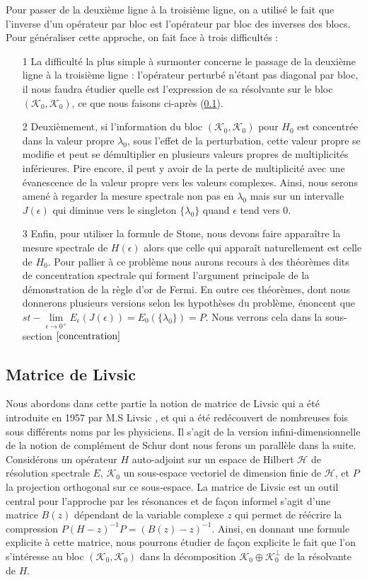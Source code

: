 \documentclass[12pt,openany,a4paper, titlepage]{article}
\newcommand{\HH}{\mathcal{H}}
\newcommand{\KK}{\mathcal{K}}
\newcommand{\inv}{^{-1}}
\newcommand{\limeo}{\lim\limits_{\epsilon \rightarrow 0^+}}
\theoremstyle{definition}
\theoremstyle{definition}
\theoremstyle{definition}
\theoremstyle{definition}
\theoremstyle{definition}
\theoremstyle{definition}
\begin{document}
Pour passer de la deuxième ligne à la troisième ligne, on a utilisé le fait que l'inverse d'un opérateur par bloc est l'opérateur par bloc des inverses des blocs. 
Pour généraliser cette approche, on fait face à trois difficultés :
\begin{enumerate}
    \item[1] La difficulté la plus simple à surmonter concerne le passage de la deuxième ligne à la troisième ligne : l'opérateur perturbé n'étant pas diagonal par bloc, il nous faudra étudier quelle est l'expression de sa résolvante sur le bloc $(\KK_0,\KK_0)$, ce que nous faisons ci-après (\ref{matrice_livsic}).
    \item[2] Deuxièmement, si l'information du bloc $(\KK_0,\KK_0)$ pour $H_0$ est concentrée dans la valeur propre $\lambda_0$, sous l'effet de la perturbation, cette valeur propre se modifie et peut se démultiplier en plusieurs valeurs propres de multiplicités inférieures. Pire encore, il peut y avoir de la perte de multiplicité avec une évanescence de la valeur propre vers les valeurs complexes. Ainsi, nous serons amené à regarder la mesure spectrale non pas en $\lambda_0$ mais sur un intervalle $J(\epsilon)$ qui diminue vers le singleton $\{\lambda_0\}$ quand $\epsilon$ tend vers $0$.
    \item[3] Enfin, pour utiliser la formule de Stone, nous devons faire apparaître la mesure spectrale de $H(\epsilon)$ alors que celle qui apparaît naturellement est celle de $H_0$. Pour pallier à ce problème nous aurons recours à des théorèmes dits de concentration spectrale qui forment l'argument principale de la démonstration de la règle d'or de Fermi. En outre ces théorèmes, dont nous donnerons plusieurs versions selon les hypothèses du problème, énoncent que $st-\limeo E_\epsilon(J(\epsilon)) = E_0(\{\lambda_0\}) = P$. Nous verrons cela dans la sous-section $\ref{concentration}$
\end{enumerate}

\subsection{Matrice de Livsic}\label{matrice_livsic}

Nous abordons dans cette partie la notion de matrice de Livsic qui a été introduite en 1957 par M.S Livsic \cite{HOWLAND1975415}, et qui a été redécouvert de nombreuses fois sous différents noms par les physiciens. Il s'agit de la version infini-dimensionnelle de la notion de complément de Schur dont nous ferons un parallèle dans la suite. Considérons un opérateur $H$ auto-adjoint sur un espace de Hilbert $\HH$ de résolution spectrale $E$, $\mathcal{K}_0$ un sous-espace vectoriel de dimension finie de $\HH$, et $P$ la projection orthogonal sur ce sous-espace. La matrice de Livsic est un outil central pour l'approche par les résonances et de façon informel s'agit d'une matrice $B(z)$ dépendant de la variable complexe $z$ qui permet de réécrire la compression $P(H-z)\inv P = (B(z) -z)\inv$. Ainsi, en donnant une formule explicite à cette matrice, nous pourrons étudier de façon explicite le fait que l'on s'intéresse au bloc $(\mathcal{K}_0,\mathcal{K}_0)$ dans la décomposition $\mathcal{K}_0\oplus \mathcal{K}_0^\perp$ de la résolvante de $H$.
\end{document}
